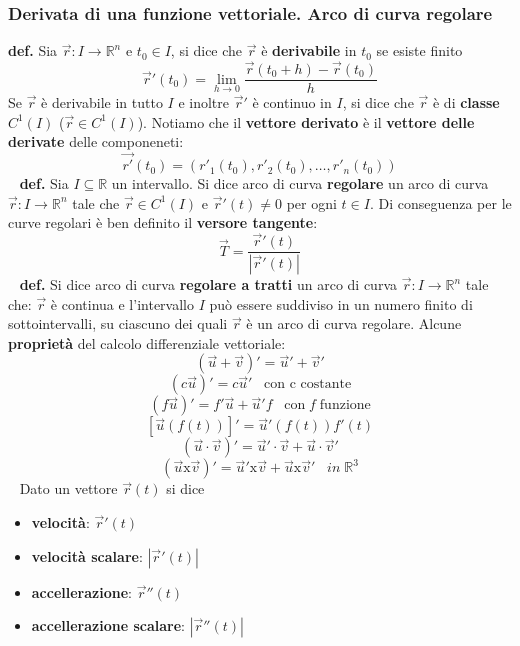\subsubsection{Derivata di una funzione vettoriale. Arco di curva regolare}
\textbf{def.} Sia $\vec{r}: I \rightarrow \mathbb{R}^n$ e $t_0 \in I$, si dice che $\vec{r}$ è \textbf{derivabile} in $t_0$ se esiste finito
\[
    \vec{r}'(t_0) = \lim_{h\rightarrow 0}\frac{\vec{r}(t_0 +h) - \vec{r}(t_0)}{h}
\]
Se $\vec{r}$ è derivabile in tutto $I$ e inoltre $\vec{r}'$ è continuo in $I$, si dice che $\vec{r}$ è di \textbf{classe} $C^1(I)$ ($\vec{r}\in C^1(I)$).
\newline
\newline
Notiamo che il \textbf{vettore derivato} è il \textbf{vettore delle derivate} delle componeneti:
\[
    \vec{r'}(t_0) = (r'_1(t_0), r'_2(t_0), \dots, r'_n(t_0))
\]
\ \newline
\textbf{def.} Sia $I \subseteq \mathbb{R}$ un intervallo. Si dice arco di curva \textbf{regolare} un arco di curva $\vec{r}: I \rightarrow  \mathbb{R}^n$ tale che $\vec{r} \in C^1(I)$ e $\vec{r}'(t) \neq 0$ per ogni $t \in I$.\newline
\newline
Di conseguenza per le curve regolari è ben definito il \textbf{versore tangente}:
\[
    \vec{T} = \frac{\vec{r}'(t)}{|\vec{r}'(t)|}
\]
\ \newline
\textbf{def.} Si dice arco di curva \textbf{regolare a tratti} un arco di curva $\vec{r} : I \rightarrow \mathbb{R}^n$ tale che: $\vec{r}$ è continua e l'intervallo $I$ può essere suddiviso in un numero finito di sottointervalli, su ciascuno dei quali $\vec{r}$ è un arco di curva regolare.\newline
\newline
Alcune \textbf{proprietà} del calcolo differenziale vettoriale:
\[
    (\vec{u} + \vec{v})' = \vec{u}' + \vec{v}'
\]
\[
    (c \vec{u})' = c \vec{u}' \;\;\; \text{con c costante}
\]
\[
    (f \vec{u})' = f' \vec{u} + \vec{u}' f \;\;\;\text{con} \; f \; \text{funzione}
\]
\[
    [\vec{u}(f(t))]' = \vec{u}'(f(t))f'(t)
\]
\[
    (\vec{u} \cdot \vec{v})' = \vec{u}' \cdot  \vec{v} + \vec{u} \cdot  \vec{v}'
\]
\[
    (\vec{u} \text{x} \vec{v})' = \vec{u}' \text{x} \vec{v} + \vec{u} \text{x} \vec{v}' \;\;\; in \;\mathbb{R}^3
\]
\ \newline
Dato un vettore $\vec{r}(t)$ si dice
\begin{itemize}
    \item \textbf{velocità}: $\vec{r}'(t)$
    \item \textbf{velocità scalare}: $|\vec{r}'(t)|$
    \item \textbf{accellerazione}: $\vec{r}''(t)$
    \item \textbf{accellerazione scalare}: $|\vec{r}''(t)|$
\end{itemize}
